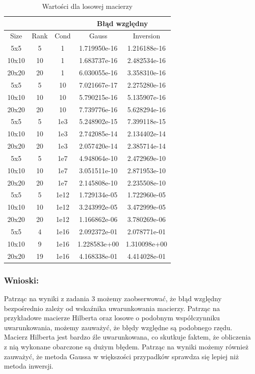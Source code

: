 \documentclass[12pt]{article}
\begin{document}
\newpage
\begin{table}[!h]
\small
\centering
    \label{tab:table3}
    \begin{tabular}{|c|c|c|c|c|}
    		\hline
		\multicolumn{3}{|c|}{} & \multicolumn{2}{c|}{Błąd względny}\\
		\hline
		Size & Rank & Cond & Gauss & Inversion\\
		\hline
5x5 & 5 & 1 & 1.719950e-16 & 1.216188e-16\\
\hline
10x10 & 10 & 1 & 1.683737e-16 & 2.482534e-16\\
\hline
20x20 & 20 & 1 & 6.030055e-16 & 3.358310e-16\\
\hline
5x5 & 5 & 10 & 7.021667e-17 & 2.275280e-16\\
\hline
10x10 & 10 & 10 & 5.790215e-16 & 5.135907e-16\\
\hline
20x20 & 20 & 10 & 7.739776e-16 & 5.628294e-16\\
\hline
5x5 & 5 & 1e3 & 5.248902e-15 & 7.399118e-15\\
\hline
10x10 & 10 & 1e3 & 2.742085e-14 & 2.134402e-14\\
\hline
20x20 & 20 & 1e3 & 2.057420e-14 & 2.385714e-14\\
\hline
5x5 & 5 & 1e7 & 4.948064e-10 & 2.472969e-10\\
\hline
10x10 & 10 & 1e7 & 3.051511e-10 & 2.871953e-10\\
\hline
20x20 & 20 & 1e7 & 2.145808e-10 & 2.235508e-10\\
\hline
5x5 & 5 & 1e12 & 1.729134e-05 & 1.722960e-05\\
\hline
10x10 & 10 & 1e12 & 3.243992e-05 & 3.472999e-05\\
\hline
20x20 & 20 & 1e12 & 1.166862e-06 & 3.780269e-06\\
\hline
5x5 & 4 & 1e16 & 2.092372e-01 & 2.078771e-01\\
\hline
10x10 & 9 & 1e16 & 1.228583e+00 & 1.310098e+00\\
\hline
20x20 & 19 & 1e16 & 4.168338e-01 & 4.414028e-01\\
\hline
    \end{tabular}
    \caption{Wartości dla losowej macierzy }
\end{table}

\subsubsection*{Wnioski:}
Patrząc na wyniki z zadania 3 możemy zaobserwować, że błąd względny bezpośrednio zależy od wskaźnika uwarunkowania macierzy. Patrząc na przykładowe macierze Hilberta oraz losowe o podobnym współczynniku uwarunkowania, możemy zauważyć, że błędy względne są podobnego rzędu. Macierz Hilberta jest bardzo źle uwarunkowana, co skutkuje faktem, że obliczenia z nią wykonane obarczone są dużym błędem. Patrząc na wyniki możemy również zauważyć, że metoda Gaussa w większości przypadków sprawdza się lepiej niż metoda inwersji.
\end{document}
